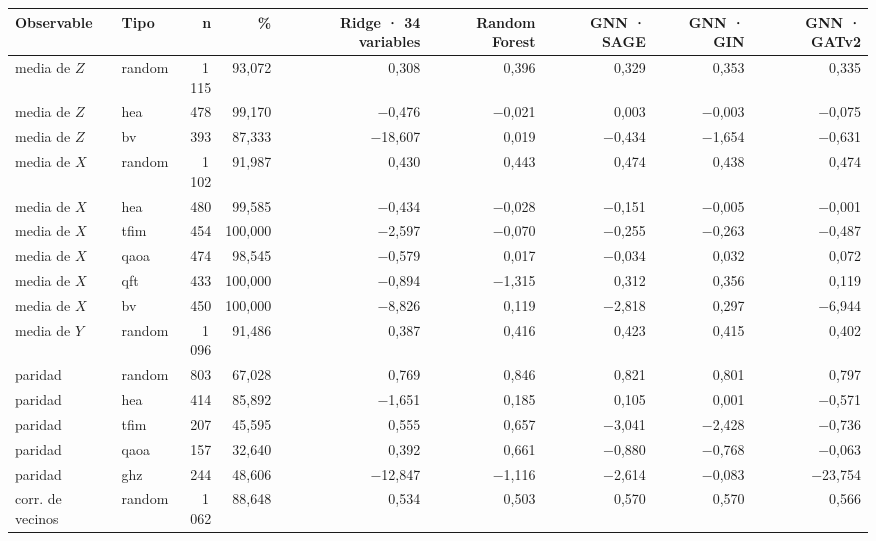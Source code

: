 \begin{table}[htbp]
    \centering
    {\footnotesize
    \begin{tabular}{@{}llrrrrrrr@{}}
        \toprule
        \textbf{Observable} & \textbf{Tipo} & \textbf{n} & \textbf{\%} & \textbf{Ridge · 34 variables} & \textbf{Random Forest} & \textbf{GNN · SAGE} & \textbf{GNN · GIN} & \textbf{GNN · GATv2} \\
        \midrule
        media de $Z$ & random & 1\,115 & 93,072 & 0,308 & 0,396 & 0,329 & 0,353 & 0,335 \\
        media de $Z$ & hea & 478 & 99,170 & $-$0,476 & $-$0,021 & 0,003 & $-$0,003 & $-$0,075 \\
        media de $Z$ & bv & 393 & 87,333 & $-$18,607 & 0,019 & $-$0,434 & $-$1,654 & $-$0,631 \\
        media de $X$ & random & 1\,102 & 91,987 & 0,430 & 0,443 & 0,474 & 0,438 & 0,474 \\
        media de $X$ & hea & 480 & 99,585 & $-$0,434 & $-$0,028 & $-$0,151 & $-$0,005 & $-$0,001 \\
        media de $X$ & tfim & 454 & 100,000 & $-$2,597 & $-$0,070 & $-$0,255 & $-$0,263 & $-$0,487 \\
        media de $X$ & qaoa & 474 & 98,545 & $-$0,579 & 0,017 & $-$0,034 & 0,032 & 0,072 \\
        media de $X$ & qft & 433 & 100,000 & $-$0,894 & $-$1,315 & 0,312 & 0,356 & 0,119 \\
        media de $X$ & bv & 450 & 100,000 & $-$8,826 & 0,119 & $-$2,818 & 0,297 & $-$6,944 \\
        media de $Y$ & random & 1\,096 & 91,486 & 0,387 & 0,416 & 0,423 & 0,415 & 0,402 \\
        paridad & random & 803 & 67,028 & 0,769 & 0,846 & 0,821 & 0,801 & 0,797 \\
        paridad & hea & 414 & 85,892 & $-$1,651 & 0,185 & 0,105 & 0,001 & $-$0,571 \\
        paridad & tfim & 207 & 45,595 & 0,555 & 0,657 & $-$3,041 & $-$2,428 & $-$0,736 \\
        paridad & qaoa & 157 & 32,640 & 0,392 & 0,661 & $-$0,880 & $-$0,768 & $-$0,063 \\
        paridad & ghz & 244 & 48,606 & $-$12,847 & $-$1,116 & $-$2,614 & $-$0,083 & $-$23,754 \\
        corr. de vecinos & random & 1\,062 & 88,648 & 0,534 & 0,503 & 0,570 & 0,570 & 0,566 \\

\end{tabular}}
\end{table}

